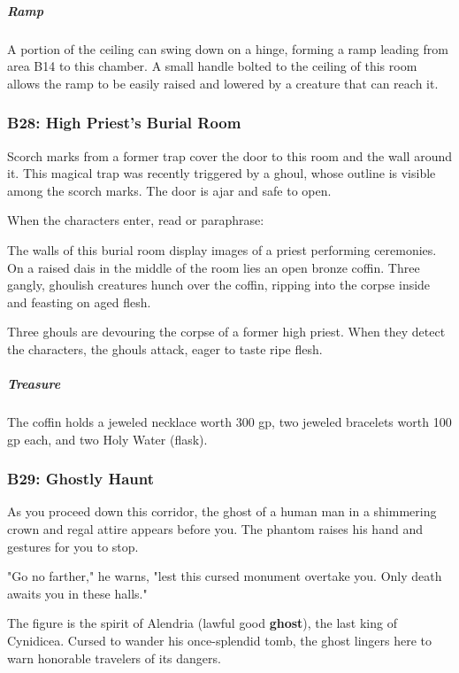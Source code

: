 \documentclass[10pt,a4paper,twoside,bg=print,twocolumn,openany,nodeprecatedcode]{dndbook}
\begin{document}
\subparagraph{Ramp}
A portion of the ceiling can swing down on a hinge, forming a ramp leading from area B14 to this chamber. A small handle bolted to the ceiling of this room allows the ramp to be easily raised and lowered by a creature that can reach it.

\subsubsection{B28: High Priest's Burial Room}
Scorch marks from a former trap cover the door to this room and the wall around it. This magical trap was recently triggered by a ghoul, whose outline is visible among the scorch marks. The door is ajar and safe to open.

When the characters enter, read or paraphrase:

\begin{DndReadAloud}{}
The walls of this burial room display images of a priest performing ceremonies. On a raised dais in the middle of the room lies an open bronze coffin. Three gangly, ghoulish creatures hunch over the coffin, ripping into the corpse inside and feasting on aged flesh.

\end{DndReadAloud}

Three ghouls are devouring the corpse of a former high priest. When they detect the characters, the ghouls attack, eager to taste ripe flesh.

\subparagraph{Treasure}
The coffin holds a jeweled necklace worth 300 gp, two jeweled bracelets worth 100 gp each, and two Holy Water (flask).

\subsubsection{B29: Ghostly Haunt}
\begin{DndReadAloud}{}
As you proceed down this corridor, the ghost of a human man in a shimmering crown and regal attire appears before you. The phantom raises his hand and gestures for you to stop.

"Go no farther," he warns, "lest this cursed monument overtake you. Only death awaits you in these halls."

\end{DndReadAloud}

The figure is the spirit of Alendria (lawful good \textbf{ghost}), the last king of Cynidicea. Cursed to wander his once-splendid tomb, the ghost lingers here to warn honorable travelers of its dangers.
\end{document}

